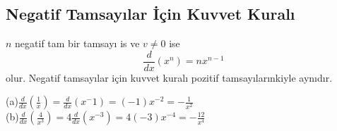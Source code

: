 \subsection{\protect Negatif Tamsayılar İçin Kuvvet Kuralı}
	$n$ negatif tam bir tamsayı is ve $v\ne 0$ ise
	\begin{equation*}
	\frac{d}{dx}(x^n)=nx^{n-1}
	\end{equation*}
olur. Negatif tamsayılar için kuvvet kuralı pozitif tamsayılarınkiyle aynıdır.
\begin{ornek} 


(a)$\displaystyle \frac{d}{dx}\left(\frac{1}{x}\right)=\frac{d}{dx}(x^-1)=(-1)x^{-2}=-\frac{1}{x^2}$\\
(b)$\displaystyle \frac{d}{dx}\left(\frac{4}{x^3}\right)=4\frac{d}{dx}(x^{-3})=4(-3)x^{-4}=-\frac{12}{x^4}$
\end{ornek}

